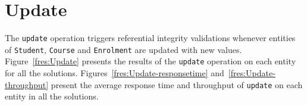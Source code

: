 
\section{Update} \label{s:results-update}
The \texttt{update} operation triggers  referential
integrity validations whenever entities of \texttt{Student},  \texttt{Course}
and \texttt{Enrolment} are updated with new values.  Figure~\ref{fres:Update}
presents the results of the \texttt{update} operation on each entity for all the
solutions. 
Figures~\ref{fres:Update-responsetime} and~\ref{fres:Update-throughput} present
the average response time and throughput of
\texttt{update} on each entity in all the solutions. 

	\begin{figure}[H] 

\end{figure}
